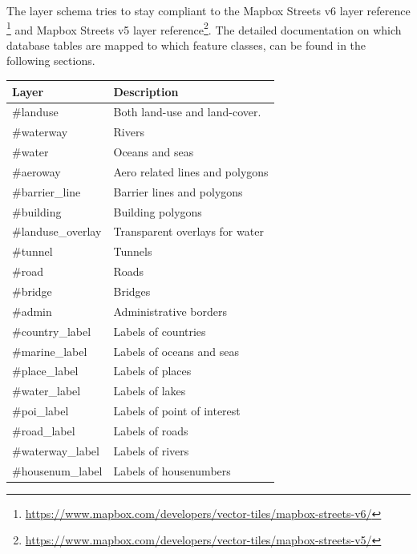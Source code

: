 The layer schema tries to stay compliant to the Mapbox Streets v6 layer reference \footnote{\url{https://www.mapbox.com/developers/vector-tiles/mapbox-streets-v6/}} and Mapbox Streets v5 layer reference\footnote{\url{https://www.mapbox.com/developers/vector-tiles/mapbox-streets-v5/}}. The detailed documentation on which database tables are mapped to which feature classes, can be found in the following sections.

\begin{flushleft}
    \begin{tabular}{ll}
    \hline
     Layer             & Description                     \\
    \hline
    \#landuse          & Both land-use and land-cover.   \\
    \#waterway         & Rivers                          \\
    \#water            & Oceans and seas                 \\
    \#aeroway          & Aero related lines and polygons \\
    \#barrier\_line    & Barrier lines and polygons      \\
    \#building         & Building polygons               \\
    \#landuse\_overlay & Transparent overlays for water  \\
    \#tunnel           & Tunnels                         \\
    \#road             & Roads                           \\
    \#bridge           & Bridges                         \\
    \#admin            & Administrative borders          \\
    \#country\_label   & Labels of countries             \\
    \#marine\_label    & Labels of oceans and seas       \\
    \#place\_label     & Labels of places                \\
    \#water\_label     & Labels of lakes                 \\
    \#poi\_label       & Labels of point of interest     \\
    \#road\_label      & Labels of roads                 \\
    \#waterway\_label  & Labels of rivers                \\
    \#housenum\_label  & Labels of housenumbers          \\
    \end{tabular}
\end{flushleft}

